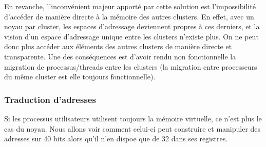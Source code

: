     En revanche, l'inconvénient majeur apporté par cette solution est
    l'impossibilité d'accéder de manière directe à la mémoire des autres
    clusters. En effet, avec un noyau par cluster, les espaces d'adressage
    deviennent propres à ces derniers, et la vision d'un espace d'adressage
    unique entre les clusters n'existe plus. On ne peut donc plus accéder aux
    éléments des autres clusters de manière directe et transparente. Une des
    conséquences est d'avoir rendu non fonctionnelle la migration de
    processus/threads entre les clusters (la migration entre processeurs du même
    cluster est elle toujours fonctionnelle).

    \subsubsection{Traduction d'adresses}

      Si les processus utilisateurs utilisent toujours la mémoire virtuelle, ce
      n'est plus le cas du noyau. Nous allons voir comment celui-ci peut
      construire et manipuler des adresses sur 40 bits alors qu'il n'en dispoe
      que de 32 dans ses registres.

